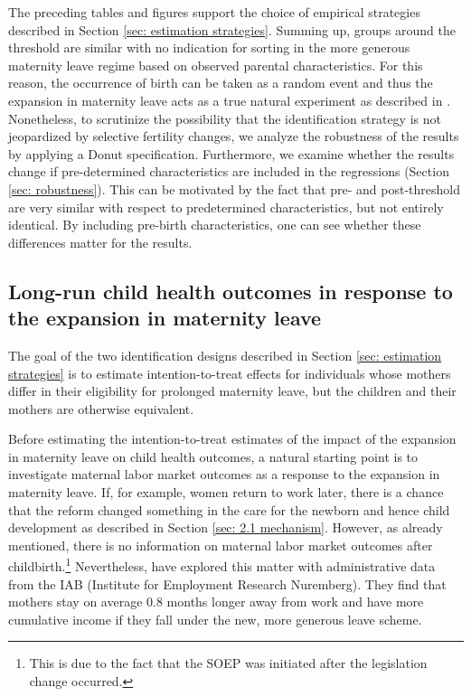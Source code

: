 \documentclass[a4paper ]{article}
\begin{document}
The preceding tables and figures support the choice of empirical strategies described in Section \ref{sec: estimation strategies}. Summing up, groups around the threshold are similar with no indication for sorting in the more generous maternity leave regime based on observed parental characteristics. For this reason, the occurrence of birth can be taken as a random event \citep{ekberg2013parental} and thus the expansion in maternity leave acts as a true natural experiment as described in \cite{rosenzweig2000natural}.\newline
Nonetheless, to scrutinize the possibility that the identification strategy is not jeopardized by selective fertility changes, we analyze the robustness of the results by applying a Donut specification. Furthermore, we examine whether the results change if pre-determined characteristics are included in the regressions (Section \ref{sec: robustness}). This can be motivated by the fact that pre- and post-threshold are very similar with respect to predetermined characteristics, but not entirely identical. By including pre-birth characteristics, one can see whether these differences matter for the results.











\subsection{Long-run child health outcomes in response to the expansion in maternity leave}\label{sec: health outcomes}
The goal of the two identification designs described in Section \ref{sec: estimation strategies} is to estimate intention-to-treat effects for individuals whose mothers differ in their eligibility for prolonged maternity leave, but the children and their mothers are otherwise equivalent. \newline


Before estimating the intention-to-treat estimates of the impact of the expansion in maternity leave on child health outcomes, a natural starting point is to investigate maternal labor market outcomes as a response to the expansion in maternity leave. If, for example, women return to work later, there is a chance that the reform changed something in the care for the newborn and hence child development as described in Section \ref{sec: 2.1 mechanism}. However, as already mentioned, there is no information on maternal labor market outcomes after childbirth.\footnote{This is due to the fact that the SOEP was initiated after the legislation change occurred.} Nevertheless, \cite{dustmann2012expansions} have explored this matter with administrative data from the IAB (Institute for Employment Research Nuremberg). They find that mothers stay on average 0.8 months longer away from work and have more cumulative income if they fall under the new, more generous leave scheme.\newline
\end{document}
